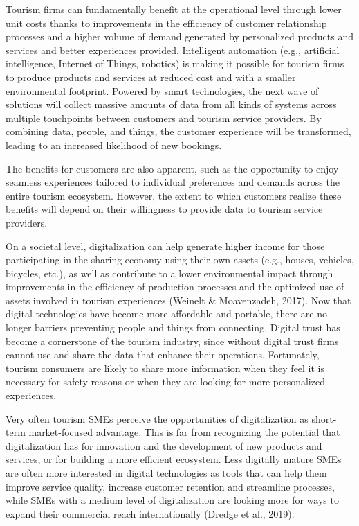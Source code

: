 \documentclass[
  letterpaper,
  DIV=11,
  numbers=noendperiod]{scrreprt}
\begin{document}
Tourism firms can fundamentally benefit at the operational level through
lower unit costs thanks to improvements in the efficiency of customer
relationship processes and a higher volume of demand generated by
personalized products and services and better experiences provided.
Intelligent automation (e.g., artificial intelligence, Internet of
Things, robotics) is making it possible for tourism firms to produce
products and services at reduced cost and with a smaller environmental
footprint. Powered by smart technologies, the next wave of solutions
will collect massive amounts of data from all kinds of systems across
multiple touchpoints between customers and tourism service providers. By
combining data, people, and things, the customer experience will be
transformed, leading to an increased likelihood of new bookings.

The benefits for customers are also apparent, such as the opportunity to
enjoy seamless experiences tailored to individual preferences and
demands across the entire tourism ecosystem. However, the extent to
which customers realize these benefits will depend on their willingness
to provide data to tourism service providers.

On a societal level, digitalization can help generate higher income for
those participating in the sharing economy using their own assets (e.g.,
houses, vehicles, bicycles, etc.), as well as contribute to a lower
environmental impact through improvements in the efficiency of
production processes and the optimized use of assets involved in tourism
experiences (Weinelt \& Moavenzadeh, 2017). Now that digital
technologies have become more affordable and portable, there are no
longer barriers preventing people and things from connecting. Digital
trust has become a cornerstone of the tourism industry, since without
digital trust firms cannot use and share the data that enhance their
operations. Fortunately, tourism consumers are likely to share more
information when they feel it is necessary for safety reasons or when
they are looking for more personalized experiences.

Very often tourism SMEs perceive the opportunities of digitalization as
short-term market-focused advantage. This is far from recognizing the
potential that digitalization has for innovation and the development of
new products and services, or for building a more efficient ecosystem.
Less digitally mature SMEs are often more interested in digital
technologies as tools that can help them improve service quality,
increase customer retention and streamline processes, while SMEs with a
medium level of digitalization are looking more for ways to expand their
commercial reach internationally (Dredge et al., 2019).
\end{document}
